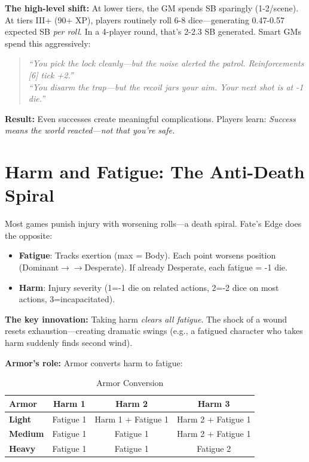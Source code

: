 \documentclass[11pt]{article}
\begin{document}
\textbf{The high-level shift:} At lower tiers, the GM spends SB sparingly (1-2/scene). At tiers III+ (90+ XP), players routinely roll 6-8 dice---generating 0.47-0.57 expected SB \textit{per roll}. In a 4-player round, that's 2-2.3 SB generated. Smart GMs spend this aggressively:
\begin{quote}
    \textit{``You pick the lock cleanly---but the noise alerted the patrol. Reinforcements [6] tick +2.''} \\
    \textit{``You disarm the trap---but the recoil jars your aim. Your next shot is at -1 die.''}
\end{quote}
\textbf{Result:} Even successes create meaningful complications. Players learn: \textit{Success means the world reacted---not that you're safe.}

\section{Harm and Fatigue: The Anti-Death Spiral}

Most games punish injury with worsening rolls---a death spiral. Fate's Edge does the opposite:

\begin{itemize}
    \item \textbf{Fatigue}: Tracks exertion (max = Body). Each point worsens position (Dominant$\rightarrow$$\rightarrow$Desperate). If already Desperate, each fatigue = -1 die.
    \item \textbf{Harm}: Injury severity (1=-1 die on related actions, 2=-2 dice on most actions, 3=incapacitated).
\end{itemize}

\textbf{The key innovation:} Taking harm \textit{clears all fatigue}. The shock of a wound resets exhaustion---creating dramatic swings (e.g., a fatigued character who takes harm suddenly finds second wind).

\textbf{Armor's role:} Armor converts harm to fatigue:

\begin{table}[h]
\centering
\caption{Armor Conversion}
\begin{tabular}{>{\bfseries}l ccc}
\toprule
Armor & Harm 1 & Harm 2 & Harm 3 \\
\midrule
Light & Fatigue 1 & Harm 1 + Fatigue 1 & Harm 2 + Fatigue 1 \\
Medium & Fatigue 1 & Fatigue 1 & Harm 2 + Fatigue 1 \\
Heavy & Fatigue 1 & Fatigue 1 & Fatigue 2 \\
\bottomrule
\end{tabular}
\end{table}
\end{document}
